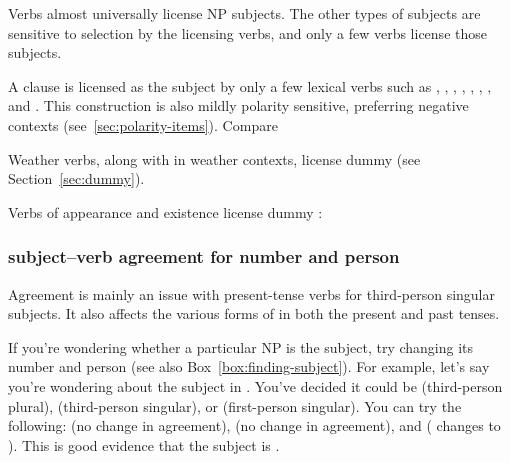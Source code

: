 Verbs almost universally license NP subjects. The other types of subjects are sensitive to selection by the licensing verbs, and only a few verbs license those subjects.

A  clause is licensed as the subject by only a few lexical verbs such as , , , , , , , and . This construction is also mildly polarity sensitive, preferring negative contexts (see~\ref{sec:polarity-items}). Compare

\ea
    \z
\z
Weather verbs, along with {} in weather contexts, license dummy  (see Section~\ref{sec:dummy}). 

\ea
    \z
\z
Verbs of appearance and existence license dummy : 

\ea
    \z
\z{}

\subsubsection*{subject--verb agreement for number and person}
Agreement is mainly an issue with present-tense verbs for third-person singular subjects. It also affects the various forms of  in both the present and past tenses. 

\ea
    \z
\z
If you're wondering whether a particular NP is the subject, try changing its number and person (see also Box~\ref{box:finding-subject}). For example, let's say you're wondering about the subject in . You've decided it could be  (third-person plural),  (third-person singular), or  (first-person singular). You can try the following:  (no change in agreement),  (no change in agreement), and  ( changes to ). This is good evidence that the subject is .

